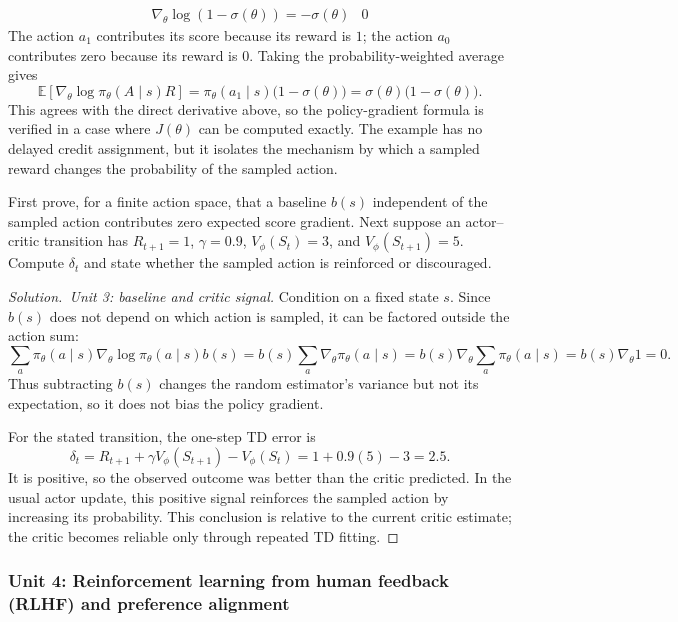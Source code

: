 \documentclass[11pt,a4paper]{article}
\theoremstyle{definition}
\newenvironment{solution}[1][]{\begin{proof}[Solution.\ #1]}{\end{proof}}
\begin{document}
\begin{example}
\[\begin{array}{c|c|c|c}
\nabla_\theta\log(1-\sigma(\theta))=-\sigma(\theta) &
0
\end{array}
\]
The action $a_1$ contributes its score because its reward is $1$; the action $a_0$ contributes
zero because its reward is $0$. Taking the probability-weighted average gives
\[
\mathbb{E}\left[
\nabla_\theta\log\pi_\theta(A\mid s)R
\right]
=\pi_\theta(a_1\mid s)\bigl(1-\sigma(\theta)\bigr)
=\sigma(\theta)\bigl(1-\sigma(\theta)\bigr).
\]
This agrees with the direct derivative above, so the policy-gradient formula is verified in a
case where $J(\theta)$ can be computed exactly. The example has no delayed credit assignment,
but it isolates the mechanism by which a sampled reward changes the probability of the sampled
action.
\end{example}

\begin{exercise}
First prove, for a finite action space, that a baseline $b(s)$ independent of the sampled
action contributes zero expected score gradient. Next suppose an actor--critic transition
has $R_{t+1}=1$, $\gamma=0.9$, $V_\phi(S_t)=3$, and $V_\phi(S_{t+1})=5$. Compute
$\delta_t$ and state whether the sampled action is reinforced or discouraged.
\end{exercise}

\begin{solution}[Unit 3: baseline and critic signal]
Condition on a fixed state $s$. Since $b(s)$ does not depend on which action is sampled, it
can be factored outside the action sum:
\[
\sum_a\pi_\theta(a\mid s)\nabla_\theta\log\pi_\theta(a\mid s)b(s)
=b(s)\sum_a\nabla_\theta\pi_\theta(a\mid s)
=b(s)\nabla_\theta\sum_a\pi_\theta(a\mid s)
=b(s)\nabla_\theta 1=0.
\]
Thus subtracting $b(s)$ changes the random estimator's variance but not its expectation, so
it does not bias the policy gradient.

For the stated transition, the one-step TD error is
\[
\delta_t
=R_{t+1}+\gamma V_\phi(S_{t+1})-V_\phi(S_t)
=1+0.9(5)-3
=2.5.
\]
It is positive, so the observed outcome was better than the critic predicted. In the usual
actor update, this positive signal reinforces the sampled action by increasing its
probability. This conclusion is relative to the current critic estimate; the critic becomes
reliable only through repeated TD fitting.
\end{solution}

\subsubsection{Unit 4: Reinforcement learning from human feedback (RLHF) and preference alignment}
\label{unit:4}
\end{document}

